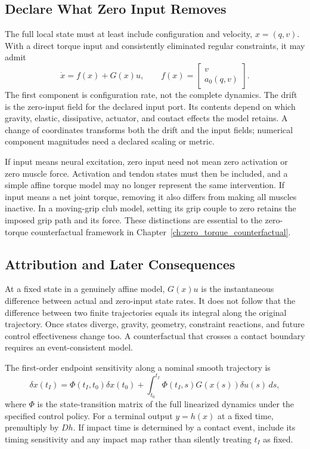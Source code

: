 \subsection{Declare What Zero Input Removes}
The full local state must at least include configuration and velocity, $x=(q,v)$. With a direct torque input and consistently eliminated regular constraints, it may admit
\begin{equation}
\dot x=f(x)+G(x)u,\qquad
f(x)=\begin{bmatrix}v\\a_0(q,v)\end{bmatrix}.
\end{equation}
The first component is configuration rate, not the complete dynamics. The drift is the zero-input field for the declared input port. Its contents depend on which gravity, elastic, dissipative, actuator, and contact effects the model retains. A change of coordinates transforms both the drift and the input fields; numerical component magnitudes need a declared scaling or metric.

If input means neural excitation, zero input need not mean zero activation or zero muscle force. Activation and tendon states must then be included, and a simple affine torque model may no longer represent the same intervention. If input means a net joint torque, removing it also differs from making all muscles inactive. In a moving-grip club model, setting its grip couple to zero retains the imposed grip path and its force. These distinctions are essential to the zero-torque counterfactual framework in Chapter~\ref{ch:zero_torque_counterfactual}.

\subsection{Attribution and Later Consequences}
At a fixed state in a genuinely affine model, $G(x)u$ is the instantaneous difference between actual and zero-input state rates. It does not follow that the difference between two finite trajectories equals its integral along the original trajectory. Once states diverge, gravity, geometry, constraint reactions, and future control effectiveness change too. A counterfactual that crosses a contact boundary requires an event-consistent model.

The first-order endpoint sensitivity along a nominal smooth trajectory is
\begin{equation}
\delta x(t_I)=\Phi(t_I,t_0)\delta x(t_0)
+\int_{t_0}^{t_I}\Phi(t_I,s)G(x(s))\delta u(s)\,ds,
\end{equation}
where $\Phi$ is the state-transition matrix of the full linearized dynamics under the specified control policy. For a terminal output $y=h(x)$ at a fixed time, premultiply by $Dh$. If impact time is determined by a contact event, include its timing sensitivity and any impact map rather than silently treating $t_I$ as fixed.

